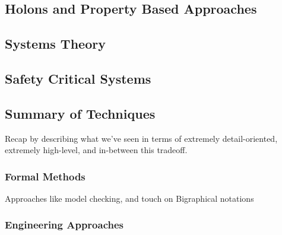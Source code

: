 \subsection{Holons and Property Based Approaches}



\subsection{Systems Theory}


\subsection{Safety Critical Systems}


\subsection{Summary of Techniques}
Recap by describing what we've seen in terms of extremely detail-oriented, extremely high-level, and in-between this tradeoff.
  
\subsubsection{Formal Methods}\label{sec:review-formal-methods}

Approaches like model checking, and touch on Bigraphical notations
\par

\subsubsection{Engineering Approaches}

